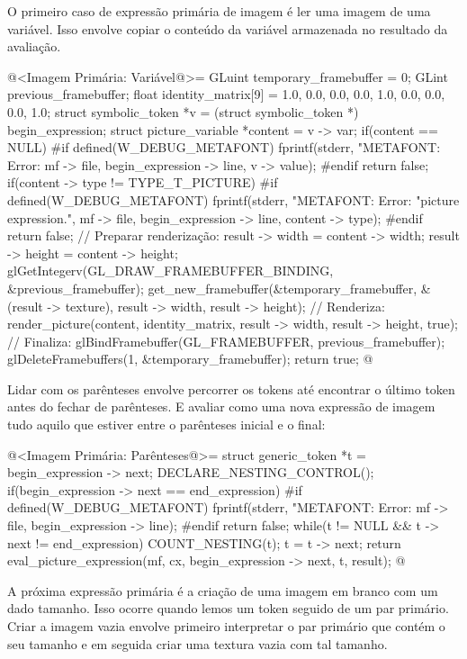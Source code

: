{O primeiro caso de expressão primária de imagem é ler uma imagem de
uma variável. Isso envolve copiar o conteúdo da variável armazenada no
resultado da avaliação.

\iniciocodigo
@<Imagem Primária: Variável@>=
GLuint temporary_framebuffer = 0;
GLint previous_framebuffer;
float identity_matrix[9] = {1.0, 0.0, 0.0,
                             0.0, 1.0, 0.0,
                             0.0, 0.0, 1.0};
struct symbolic_token *v = (struct symbolic_token *) begin_expression;
struct picture_variable *content = v -> var;
if(content == NULL){
#if defined(W_DEBUG_METAFONT)
  fprintf(stderr, "METAFONT: Error: %
          mf -> file, begin_expression -> line, v -> value);
#endif
  return false;
}
if(content -> type != TYPE_T_PICTURE){
#if defined(W_DEBUG_METAFONT)
  fprintf(stderr, "METAFONT: Error: %
                  "picture expression.\n",
          mf -> file, begin_expression -> line, content -> type);
#endif
  return false;
}
// Preparar renderização:
result -> width = content -> width;
result -> height = content -> height;
glGetIntegerv(GL_DRAW_FRAMEBUFFER_BINDING, &previous_framebuffer);
get_new_framebuffer(&temporary_framebuffer, &(result -> texture),
                    result -> width, result -> height);
// Renderiza:
render_picture(content, identity_matrix, result -> width, result -> height, true);
// Finaliza:
glBindFramebuffer(GL_FRAMEBUFFER, previous_framebuffer);
glDeleteFramebuffers(1, &temporary_framebuffer);
return true;
@
\fimcodigo

Lidar com os parênteses envolve percorrer os tokens até encontrar o
último token antes do fechar de parênteses. E avaliar como uma nova
expressão de imagem tudo aquilo que estiver entre o parênteses inicial
e o final:

\iniciocodigo
@<Imagem Primária: Parênteses@>=
struct generic_token *t = begin_expression -> next;
DECLARE_NESTING_CONTROL();
if(begin_expression -> next == end_expression){
#if defined(W_DEBUG_METAFONT)
  fprintf(stderr, "METAFONT: Error: %
          mf -> file, begin_expression -> line);
#endif
  return false;
}
while(t != NULL && t -> next != end_expression){
  COUNT_NESTING(t);
  t = t -> next;
}
return eval_picture_expression(mf, cx, begin_expression -> next, t, result);
@
\fimcodigo

A próxima expressão primária é a criação de uma imagem em branco com
um dado tamanho. Isso ocorre quando lemos um
token  seguido de um par primário. Criar a
imagem vazia envolve primeiro interpretar o par primário que contém o
seu tamanho e em seguida criar uma textura vazia com tal tamanho.

}
